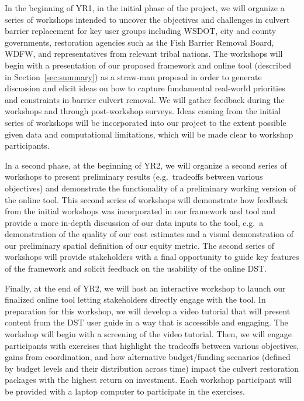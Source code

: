\documentclass[12pt]{elsarticle}
\begin{document}
In the beginning of YR1, in the initial phase of the project, we will organize a series of workshops intended to uncover the objectives and challenges in culvert barrier replacement for key user groups including WSDOT, city and county governments, restoration agencies such as the Fish Barrier Removal Board, WDFW, and representatives from relevant tribal nations. The workshops will begin with a presentation of our proposed framework and online tool (described in Section~\ref{sec:summary}) as a straw-man proposal in order to generate discussion and elicit ideas on how to capture fundamental real-world priorities and constraints in barrier culvert removal. We will gather feedback during the workshops and through post-workshop surveys. Ideas coming from the initial series of workshops will be incorporated into our project to the extent possible given data and computational limitations, which will be made clear to workshop participants.

In a second phase, at the beginning of YR2, we will organize a second series of workshops to present preliminary results (e.g.\ tradeoffs between various objectives) and demonstrate the functionality of a preliminary working version of the online tool. This second series of workshops will demonstrate how feedback from the initial workshops was incorporated in our framework and tool and provide a more in-depth discussion of our data inputs to the tool, e.g.\ a demonstration of the quality of our cost estimates and a visual demonstration of our preliminary spatial definition of our equity metric. The second series of workshops will provide stakeholders with a final opportunity to guide key features of the framework and solicit feedback on the usability of the online DST.

Finally, at the end of YR2, we will host an interactive workshop to launch our finalized online tool letting stakeholders directly engage with the tool. In preparation for this workshop, we will develop a video tutorial that will present content from the DST user guide in a way that is accessible and engaging. The workshop will begin with a screening of the video tutorial. Then, we will engage participants with exercises that highlight the tradeoffs between various objectives, gains from coordination, and how alternative budget/funding scenarios (defined by budget levels and their distribution across time) impact the culvert restoration packages with the highest return on investment. Each workshop participant will be provided with a laptop computer to participate in the exercises. 
\end{document}

